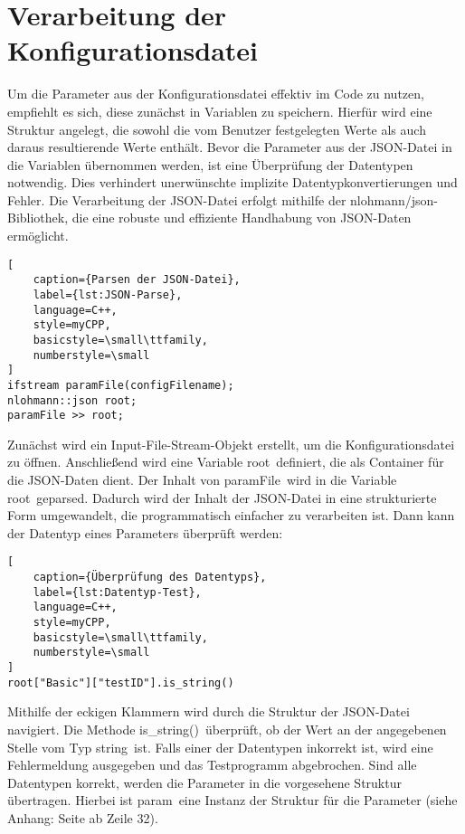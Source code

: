 \section{Verarbeitung der Konfigurationsdatei} \label{Konfigurationsdatei}

Um die Parameter aus der Konfigurationsdatei effektiv im Code zu nutzen, empfiehlt es sich, diese zunächst in Variablen zu speichern. Hierfür wird eine Struktur angelegt, die 
sowohl die vom Benutzer festgelegten Werte als auch daraus resultierende Werte enthält. Bevor die Parameter aus der JSON-Datei in die Variablen übernommen werden, ist eine 
Überprüfung der Datentypen notwendig. Dies verhindert unerwünschte implizite Datentypkonvertierungen und Fehler. Die Verarbeitung der JSON-Datei erfolgt mithilfe der 
\glqq nlohmann/json\grqq-Bibliothek, die eine robuste und effiziente Handhabung von JSON-Daten ermöglicht.

\vspace{6pt}

\begin{lstlisting}[
    caption={Parsen der JSON-Datei},
    label={lst:JSON-Parse},
    language=C++,
    style=myCPP,
    basicstyle=\small\ttfamily,
    numberstyle=\small
]
ifstream paramFile(configFilename);
nlohmann::json root;
paramFile >> root;
\end{lstlisting}

Zunächst wird ein Input-File-Stream-Objekt erstellt, um die Konfigurationsdatei zu öffnen. Anschließend wird eine Variable \glqq root\grqq\ definiert, die als Container für 
die JSON-Daten dient. Der Inhalt von \glqq paramFile\grqq\ wird in die Variable \glqq root\grqq\ geparsed. Dadurch wird der Inhalt der JSON-Datei in eine strukturierte Form 
umgewandelt, die programmatisch einfacher zu verarbeiten ist. Dann kann der Datentyp eines Parameters überprüft werden:

\vspace{12pt}

\begin{lstlisting}[
    caption={Überprüfung des Datentyps},
    label={lst:Datentyp-Test},
    language=C++,
    style=myCPP,
    basicstyle=\small\ttfamily,
    numberstyle=\small
]
root["Basic"]["testID"].is_string()
\end{lstlisting}

Mithilfe der eckigen Klammern wird durch die Struktur der JSON-Datei navigiert. Die Methode \glqq is\_string()\grqq\ überprüft, ob der Wert an der angegebenen Stelle vom Typ
\glqq string\grqq\ ist. Falls einer der Datentypen inkorrekt ist, wird eine Fehlermeldung ausgegeben und das Testprogramm abgebrochen. Sind alle Datentypen korrekt, werden 
die Parameter in die vorgesehene Struktur übertragen. Hierbei ist \glqq param\grqq\ eine Instanz der Struktur für die Parameter (siehe Anhang: Seite \pageref{ParamStruct} ab Zeile 32).

